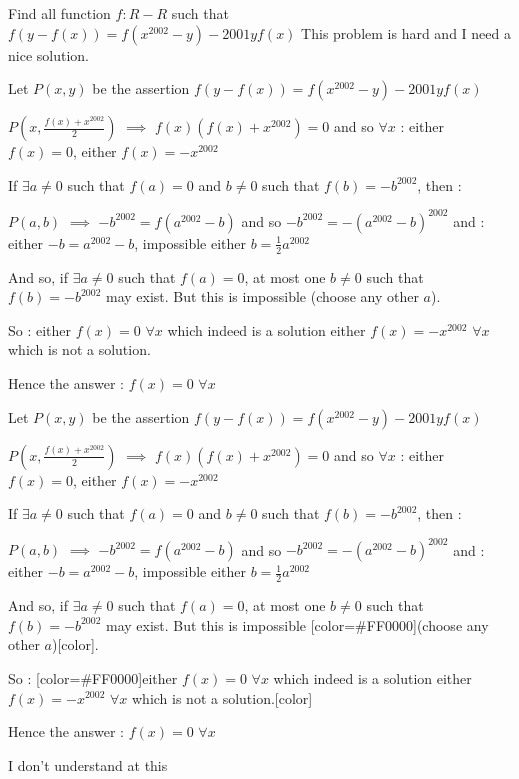 \begin{solution}
	\begin{tcolorbox}Find all function $f:R-R$ such that 
$ f(y-f(x))=f(x^{2002}-y)-2001yf(x) $
This problem is hard and I need a nice solution.\end{tcolorbox}
Let $P(x,y)$ be the assertion $f(y-f(x))=f(x^{2002}-y)-2001yf(x)$

$P(x,\frac{f(x)+x^{2002}}2)$ $\implies$ $f(x)(f(x)+x^{2002})=0$ and so $\forall x$ : either $f(x)=0$, either $f(x)=-x^{2002}$

If $\exists a\ne 0$ such that $f(a)=0$ and $b\ne 0$ such that $f(b)=-b^{2002}$, then :

$P(a,b)$ $\implies$ $-b^{2002}=f(a^{2002}-b)$ and so $-b^{2002}=-(a^{2002}-b)^{2002}$ and :
either $-b=a^{2002}-b$, impossible
either $b=\frac 12a^{2002}$

And so, if $\exists a\ne 0$ such that $f(a)=0$, at most one $b\ne 0$ such that $f(b)=-b^{2002}$ may exist. But this is impossible (choose any other $a$).

So :
either $f(x)=0$ $\forall x$ which indeed is a solution
either $f(x)=-x^{2002}$ $\forall x$ which is not a solution.

Hence the answer : $\boxed{f(x)=0}$ $\forall x$
\end{solution}



\begin{solution}
	\begin{tcolorbox}
Let $P(x,y)$ be the assertion $f(y-f(x))=f(x^{2002}-y)-2001yf(x)$

$P(x,\frac{f(x)+x^{2002}}2)$ $\implies$ $f(x)(f(x)+x^{2002})=0$ and so $\forall x$ : either $f(x)=0$, either $f(x)=-x^{2002}$

If $\exists a\ne 0$ such that $f(a)=0$ and $b\ne 0$ such that $f(b)=-b^{2002}$, then :

$P(a,b)$ $\implies$ $-b^{2002}=f(a^{2002}-b)$ and so $-b^{2002}=-(a^{2002}-b)^{2002}$ and :
either $-b=a^{2002}-b$, impossible
either $b=\frac 12a^{2002}$

And so, if $\exists a\ne 0$ such that $f(a)=0$, at most one $b\ne 0$ such that $f(b)=-b^{2002}$ may exist. But this is impossible [color=#FF0000](choose any other $a$)[\/color].

So :
[color=#FF0000]either $f(x)=0$ $\forall x$ which indeed is a solution
either $f(x)=-x^{2002}$ $\forall x$ which is not a solution.[\/color]

Hence the answer : $\boxed{f(x)=0}$ $\forall x$\end{tcolorbox}
I don't understand at this
\end{solution}



